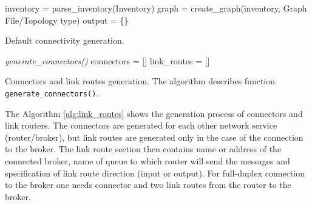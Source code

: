 \begin{center}
	\begin{algorithm}[H]
		\LinesNumbered
		\DontPrintSemicolon


		\var inventory = parse\_inventory(Inventory)\;
		\var graph = create\_graph(inventory, Graph File/Topology type)\;
		\var output = \{\}\;

		 \caption{Default connectivity generation.}
		 \label{alg:default_connections}
	\end{algorithm}
\end{center}

\begin{center}
	\begin{algorithm}[H]
		\LinesNumbered
		\DontPrintSemicolon


		\fce \emph{generate\_connectors()}\;
		\var connectors = []\;
		\var link\_routes = []\;

		 \caption{Connectors and link routes generation. The algorithm describes function \texttt{generate\_connectors()}.}
		 \label{alg:link_routes}
	\end{algorithm}
\end{center}

The Algorithm \ref{alg:link_routes} shows the generation process of connectors and link routers. The connectors are generated for each other network service (router/broker), but link routes are generated only in the case of the connection to the broker. The link route section then contains name or address of the connected broker, name of queue to which router will send the messages and specification of link route direction (input or output). For full-duplex connection to the broker one needs connector and two link routes from the router to the broker.

